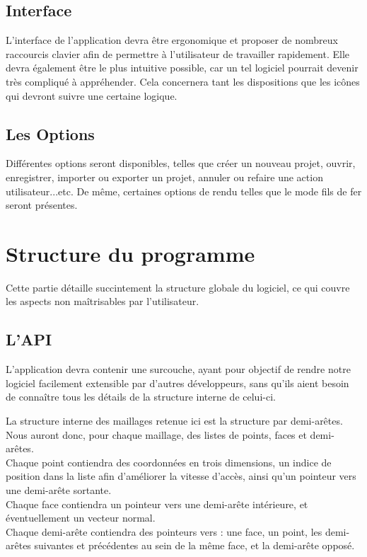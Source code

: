 \documentclass[a4paper]{memoir}
\begin{document}
			\subsection{Interface}
				L'interface de l'application devra être ergonomique et proposer de nombreux raccourcis clavier afin de permettre à l'utilisateur de 
				travailler rapidement. Elle devra également être le plus intuitive possible, car un tel logiciel pourrait devenir très compliqué à 
				appréhender. Cela concernera tant les dispositions que les icônes qui devront suivre une certaine logique.

			\subsection{Les Options}
				Différentes options seront disponibles, telles que créer un nouveau projet, ouvrir, enregistrer, importer ou exporter un projet, annuler ou 
				refaire une action utilisateur...etc. De même, certaines options de rendu telles que le mode fils de fer seront présentes.
	
		\section{Structure du programme}
			Cette partie détaille succintement la structure globale du logiciel, ce qui couvre les aspects non maîtrisables par l'utilisateur.
			
			\subsection{L'API}
				L'application devra contenir une surcouche, ayant pour objectif de rendre notre logiciel facilement extensible par d'autres développeurs, 
				sans qu'ils aient besoin de connaître tous les détails de la structure interne de celui-ci.
				
				La structure interne des maillages retenue ici est la structure par demi-arêtes. Nous auront donc, pour chaque maillage, des listes de 
				points, faces et demi-arêtes.\\ Chaque point contiendra des coordonnées en trois dimensions, un indice de position dans la liste afin 
				d'améliorer la vitesse d'accès, ainsi qu'un pointeur vers une demi-arête sortante.\\ Chaque face contiendra un pointeur vers une demi-arête 
				intérieure, et éventuellement un vecteur normal.\\ Chaque demi-arête contiendra des pointeurs vers : une face, un point, les demi-arêtes 
				suivantes et précédentes au sein de la même face, et la demi-arête opposé.
				
\end{document}
